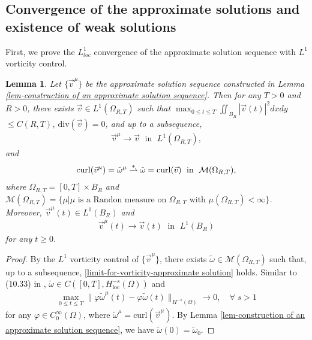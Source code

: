 \documentclass[1 [leqno, 11pt]{amsart}
\numberwithin{equation}{section}
\newtheorem{lemma}[Theorem]{Lemma}
\begin{document}
\begin{CJK*}{GBK}{song}
\begin{appendix}
\subsection{Convergence of the approximate solutions and existence of weak solutions}
First, we prove the $L_{loc}^1$ convergence of the approximate solution sequence with $L^1$ vorticity control.
\begin{lemma}\label{convergence of an approximate solution sequence}
Let $\{\vec{v}^\mu\}$ be the approximate solution sequence constructed in Lemma \ref{lem-construction of an approximate solution sequence}. Then for any $T>0$ and $R>0$, there exists $\vec{v}\in L^1(\Omega_{R,T})$ such that $\max_{0\leq t\leq T}\iint_{B_R}|\vec{v}(t)|^2dxdy$ $\leq C(R,T)$, $\text{div}(\vec{v})=0$, and up to a subsequence,
\begin{align}\label{limit-for-approximate solution}
\vec{v}^{\mu}\to\vec{v} \;\text{ in }\; L^1(\Omega_{R,T}),\end{align}
and
\begin{align}\label{limit-for-vorticity-approximate solution}
\textup{curl}(\vec{v}^{\mu})=\tilde\omega^{\mu}\stackrel{*}{\rightharpoonup}\tilde \omega=\textup{curl}(\vec{v}) \;\text{ in }\; \mathcal{M}(\Omega_{R,T}),\end{align}
where $\Omega_{R,T}=[0,T]\times B_R$ and $\mathcal{M}(\Omega_{R,T})=\{\mu| \mu \text{ is a Randon measure on }\Omega_{R,T} \text{ with } \mu(\Omega_{R,T})<\infty\}$. Moreover,  $\vec{v}^{\mu}(t)\in L^1(B_R)$ and
\begin{align}\label{limit-for-approximate solution-t}
\vec{v}^{\mu}(t)\to\vec{v}(t) \;\text{ in }\; L^1(B_R)\end{align}
for any $t\geq0$.
\end{lemma}
\begin{proof} By the $L^1$ vorticity control of $\{\vec{v}^\mu\}$, there exists $\tilde\omega\in \mathcal{M}(\Omega_{R,T})$ such that, up to a subsequence, \eqref{limit-for-vorticity-approximate solution} holds.
Similar to (10.33) in \cite{Majda-Bertozzi02}, $\tilde\omega\in C([0,T],H_{\text{loc}}^{-s}(\Omega))$ and
\begin{align}\label{H-s-estimate}
\max_{0\leq t\leq T}\|\varphi\tilde\omega^\mu(t)-\varphi\tilde\omega(t)\|_{H^{-s}(\Omega)}\to 0,\quad \forall\; s>1
\end{align}
for any $\varphi\in C_0^\infty(\Omega)$, where $\tilde \omega^\mu=\text{curl} (\vec{v}^\mu)$. By Lemma \ref{lem-construction of an approximate solution sequence}, we have $\tilde\omega(0)=\tilde \omega_0$.


\end{proof}
\end{appendix}
\end{CJK*}
\end{document}
